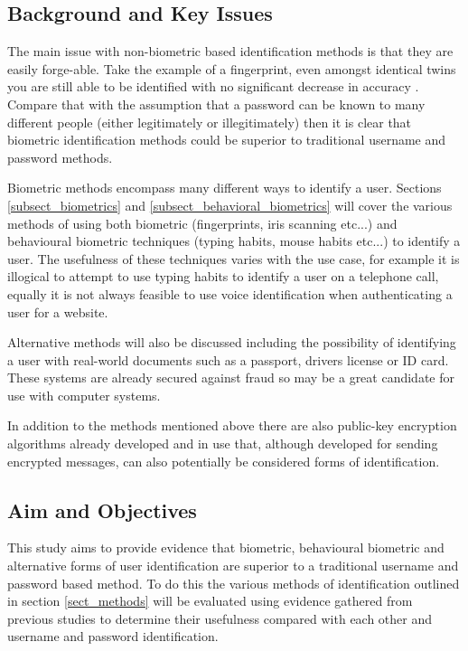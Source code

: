 \documentclass[12pt]{article}
\begin{document}
	
	\subsection{Background and Key Issues}
	The main issue with non-biometric based identification methods is that they are easily forge-able. Take the example of a fingerprint, even amongst identical twins you are still able to be identified with no significant decrease in accuracy \citep{han2004study}. Compare that with the assumption that a password can be known to many different people (either legitimately or illegitimately) then it is clear that biometric identification methods could be superior to traditional username and password methods.
	
	Biometric methods encompass many different ways to identify a user. Sections
	\ref{subsect_biometrics} and \ref{subsect_behavioral_biometrics} will cover the various methods of using both biometric (fingerprints, iris scanning etc...) and behavioural biometric techniques (typing habits, mouse habits etc...) to identify a user. The usefulness of these techniques varies with the use case, for example it is illogical to attempt to use typing habits to identify a user on a telephone call, equally it is not always feasible to use voice identification when authenticating a user for a website.
	
	Alternative methods will also be discussed including the possibility of identifying a user with real-world documents such as a passport, drivers license or ID card. These systems are already secured against fraud so may be a great candidate for use with computer systems. 
	
	In addition to the methods mentioned above there are also public-key encryption algorithms already developed and in use that, although developed for sending encrypted messages, can also potentially be considered forms of identification.
	
	\subsection{Aim and Objectives} 
	This study aims to provide evidence that biometric, behavioural biometric and alternative forms of user identification are superior to a traditional username and password based method.
	To do this the various methods of identification outlined in section \ref{sect_methods} will be evaluated using evidence gathered from previous studies to determine their usefulness compared with each other and username and password identification.
	
\end{document}
